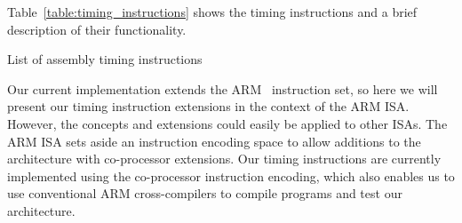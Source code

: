 Table~\ref{table:timing_instructions} shows the timing instructions and a brief description of their functionality.   

\begin{table}
\noindent{}
\caption{List of assembly timing instructions}
\label{table:timing_instructions}
\end{table}

Our current implementation extends the ARM~ instruction set, so here we will present our timing instruction extensions in the context of the ARM ISA.
However, the concepts and extensions could easily be applied to other ISAs. 
The ARM ISA sets aside an instruction encoding space to allow additions to the architecture with co-processor extensions. 
Our timing instructions are currently implemented using the co-processor instruction encoding, which also enables us to use conventional ARM cross-compilers to compile programs and test our architecture.     

